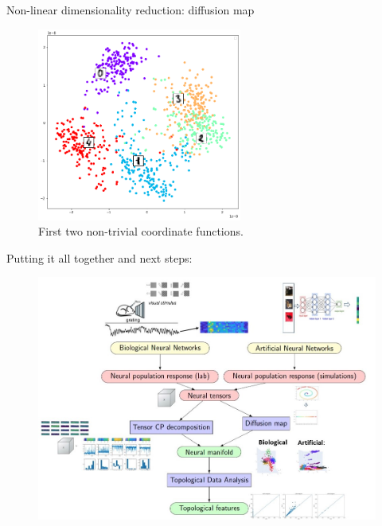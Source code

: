 \documentclass[xcolor={dvipsnames,svgnames}]{beamer}
\begin{document}
\begin{frame}{Non-linear dimensionality reduction: diffusion map}
\begin{minipage}[t]{.45\linewidth}
      \begin{figure}
                \includegraphics[width=0.6\textwidth]{mnist.png}
            \caption{First two non-trivial coordinate functions.}    
            \end{figure} 
    \end{minipage}
\end{frame}

\begin{frame}{Putting it all together and next steps:}
\begin{figure}[H]
        \centering
            \includegraphics[width=1.2\textwidth]{Slide4.jpg}
        \end{figure} 
\end{frame}

\end{document}
